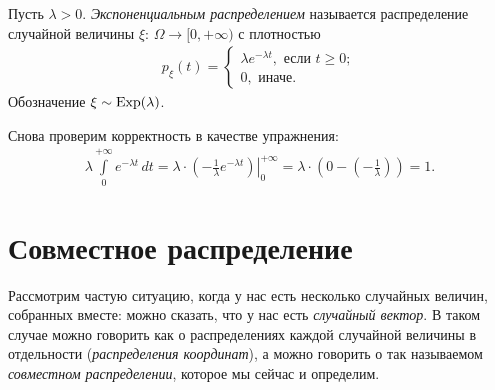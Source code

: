 \documentclass[../main.tex]{subfiles}
\begin{document}
\begin{exmpl}
Пусть $ \lambda > 0 $. \textit{Экспоненциальным распределением} называется распределение случайной величины $ \xi \colon\,\Omega\to[0,+\infty) $ с плотностью
\begin{align*}
 p_\xi(t) = \begin{cases}
  \lambda e^{-\lambda t}, \text{ если } t\geqslant 0;  \\
  0, \text{ иначе}.
 \end{cases} 
\end{align*} Обозначение $ \xi \sim \mathrm{Exp}(\lambda) $.

Снова проверим корректность в качестве упражнения:
\begin{align*}
 \lambda \int\limits_{0}^{+\infty} e^{-\lambda t}\,dt = \lambda \cdot \left. \left( -\frac{1}{\lambda} e^{-\lambda t} \right)\right|_0^{+\infty} = \lambda \cdot \left( 0 - \left( -\frac{1}{\lambda} \right) \right) = 1.
\end{align*} 
\end{exmpl}

\section{Совместное распределение}

Рассмотрим частую ситуацию, когда у нас есть несколько случайных величин, собранных вместе: можно сказать, что у нас есть \textit{случайный вектор}. В таком случае можно говорить как о распределениях каждой случайной величины в отдельности (\textit{распределения координат}), а можно говорить о так называемом \textit{совместном распределении}, которое мы сейчас и определим.
\end{document}
